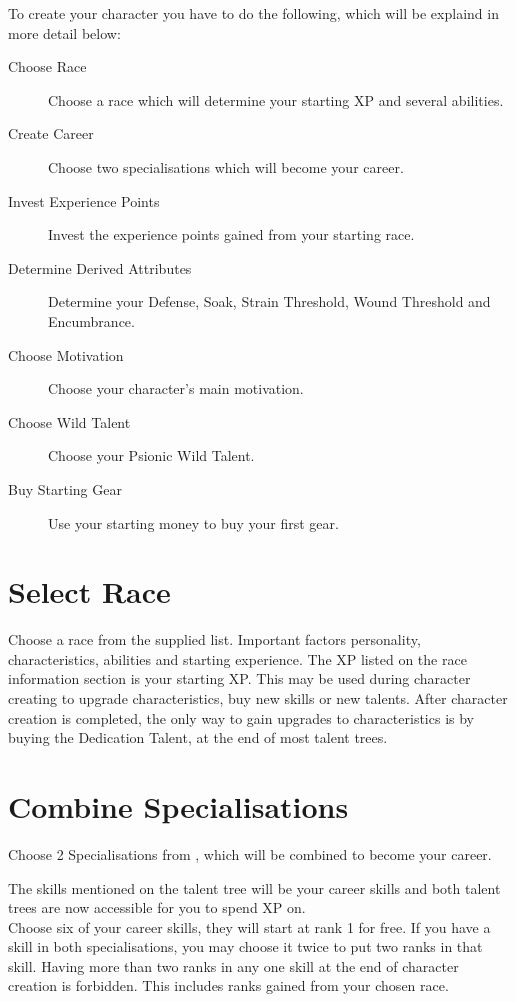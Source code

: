 \begin{multicols}{2}

To create your character you have to do the following, which will be explaind in more detail below:

\begin{description}
    \item [Choose Race] Choose a race which will determine your starting XP and several abilities.
    \item [Create Career] Choose two specialisations which will become your career.
    \item [Invest Experience Points] Invest the experience points gained from your starting race.
    \item [Determine Derived Attributes] Determine your Defense, Soak, Strain Threshold, Wound Threshold and Encumbrance.
    \item [Choose Motivation] Choose your character's main motivation.
    \item [Choose Wild Talent] Choose your Psionic Wild Talent.
    \item [Buy Starting Gear] Use your starting money to buy your first gear.
\end{description}

\section{Select Race}
Choose a race from the supplied list. Important factors personality, characteristics, abilities and starting experience.
The XP listed on the race information section is your starting XP. This may be used during character creating to upgrade characteristics, buy new skills or new talents.
After character creation is completed, the only way to gain upgrades to characteristics is by buying the Dedication Talent, at the end of most talent trees.

\section{Combine Specialisations}
Choose 2 Specialisations from , which will be combined to become your career.

The skills mentioned on the talent tree will be your career skills and both talent
trees are now accessible for you to spend XP on.\\
Choose six of your career skills, they will start at rank 1 for free. If you have
a skill in both specialisations, you may choose it twice to put two ranks in that
skill. Having more than two ranks in any one skill at the end of character creation
is forbidden. This includes ranks gained from your chosen race.


\end{multicols}
